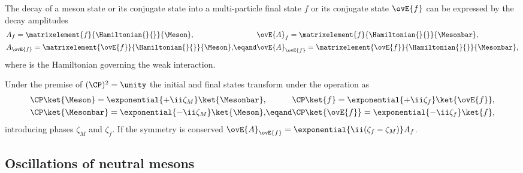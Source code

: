 The decay of a meson state \Meson or its \CP conjugate state \Mesonbar into a
multi-particle final state $f$ or its \CP conjugate state $\ovE{f}$ can be
expressed by the decay amplitudes
%
\begin{equation}\label{eq:cpv_theory:flavour_physics:bdecays:amplitudes}
  \begin{alignedat}{2}
    & A_f         = \matrixelement{f}{\Hamiltonian{}{}}{\Meson},       && \ovE{A}_f         = \matrixelement{f}{\Hamiltonian{}{}}{\Mesonbar}, \\
    & A_{\ovE{f}} = \matrixelement{\ovE{f}}{\Hamiltonian{}{}}{\Meson}, &\eqand& \ovE{A}_{\ovE{f}} = \matrixelement{\ovE{f}}{\Hamiltonian{}{}}{\Mesonbar},
  \end{alignedat}
\end{equation}
%
where \Hamiltonian{}{} is the Hamiltonian governing the weak interaction.

Under the premise of $(\CP)^2 = \unity$ the initial and final states transform under
the \CP operation as
%
\begin{equation}
  \begin{alignedat}{2}
    & \CP\ket{\Meson}    = \exponential{+\ii\zeta_{M}} \ket{\Mesonbar}, && \CP \ket{f}        = \exponential{+\ii\zeta_{f}} \ket{\ovE{f}}, \\
    & \CP\ket{\Mesonbar} = \exponential{-\ii\zeta_{M}} \ket{\Meson}   , &\eqand& \CP \ket{\ovE{f}}  = \exponential{-\ii\zeta_{f}} \ket{f},
  \end{alignedat}
\end{equation}
%
introducing phases $\zeta_M$ and $\zeta_f$. If the \CP symmetry is conserved
$\ovE{A}_{\ovE{f}} = \exponential{\ii(\zeta_f - \zeta_M)} A_f$.

\subsection[
  head={Oscillations of neutral \B mesons},
  tocentry={Oscillations of neutral \BHyperref mesons}
]{Oscillations of neutral \Bbfsf mesons}
\label{sec:cpv_theory:flavour_physics:bmixing}


